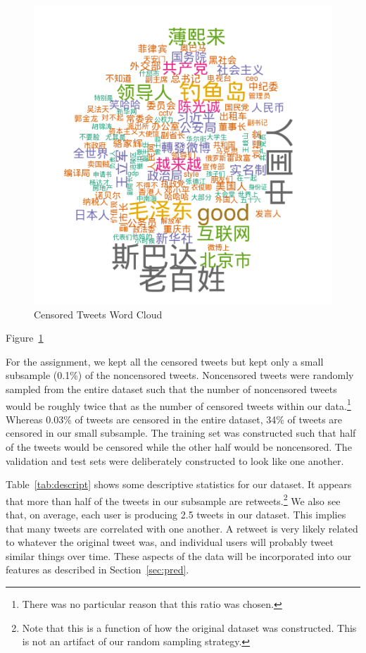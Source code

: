 \documentclass{sig-alternate-05-2015}
\begin{document}
\begin{figure}
  \centering
  \includegraphics[scale = 0.52]{wordcloud_cens.png}
  \caption{Censored Tweets Word Cloud}
  \label{fig:wordcloud}
\end{figure}

Figure~\ref{fig:wordcloud} 

For the assignment, we kept all the censored tweets but kept only a small subsample (0.1\%) of the noncensored tweets. Noncensored tweets were randomly sampled from the entire dataset such that the number of noncensored tweets would be roughly twice that as the number of censored tweets within our data.\footnote{There was no particular reason that this ratio was chosen.} Whereas 0.03\% of tweets are censored in the entire dataset, 34\% of tweets are censored in our small subsample. The training set was constructed such that half of the tweets would be censored while the other half would be noncensored. The validation and test sets were deliberately constructed to look like one another. 

Table~\ref{tab:descript} shows some descriptive statistics for our dataset. It appears that more than half of the tweets in our subsample are retweets.\footnote{Note that this is a function of how the original dataset was constructed. This is not an artifact of our random sampling strategy.} We also see that, on average, each user is producing 2.5 tweets in our dataset. This implies that many tweets are correlated with one another. A retweet is very likely related to whatever the original tweet was, and individual users will probably tweet similar things over time. These aspects of the data will be incorporated into our features as described in Section~\ref{sec:pred}.
\end{document}
